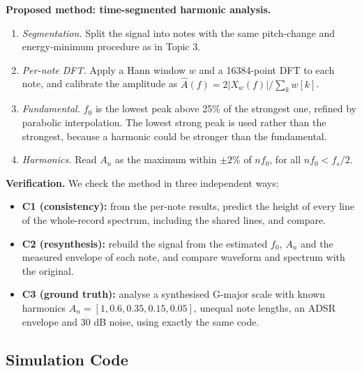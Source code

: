 \documentclass[12pt, a4paper]{article}
\begin{document}
\textbf{Proposed method: time-segmented harmonic analysis.}
\begin{enumerate}
    \item \emph{Segmentation.} Split the signal into notes with the same pitch-change and energy-minimum procedure as in Topic 3.
    \item \emph{Per-note DFT.} Apply a Hann window $w$ and a 16384-point DFT to each note, and calibrate the amplitude as $\hat A(f)=2|X_w(f)|/\sum_kw[k]$.
    \item \emph{Fundamental.} $f_0$ is the lowest peak above 25\% of the strongest one, refined by parabolic interpolation. The lowest strong peak is used rather than the strongest, because a harmonic could be stronger than the fundamental.
    \item \emph{Harmonics.} Read $A_n$ as the maximum within $\pm2\%$ of $nf_0$, for all $nf_0<f_s/2$.
\end{enumerate}

\textbf{Verification.} We check the method in three independent ways:
\begin{itemize}
    \item \textbf{C1 (consistency):} from the per-note results, predict the height of every line of the whole-record spectrum, including the shared lines, and compare.
    \item \textbf{C2 (resynthesis):} rebuild the signal from the estimated $f_0$, $A_n$ and the measured envelope of each note, and compare waveform and spectrum with the original.
    \item \textbf{C3 (ground truth):} analyse a synthesised G-major scale with known harmonics $A_n=[1,0.6,0.35,0.15,0.05]$, unequal note lengths, an ADSR envelope and 30 dB noise, using exactly the same code.
\end{itemize}

\subsection{Simulation Code}
\end{document}
